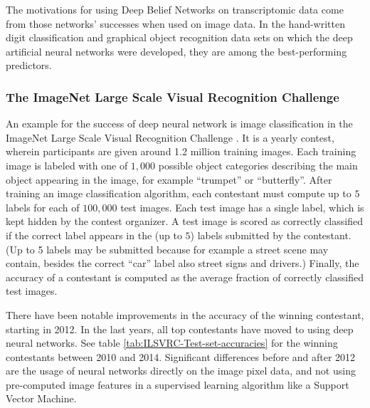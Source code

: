 The motivations for using Deep Belief Networks on transcriptomic data
come from those networks' successes when used on image data. In the
hand-written digit classification and graphical object recognition
data sets on which the deep artificial neural networks were developed,
they are among the best-performing predictors.

\subsubsection{The ImageNet Large Scale Visual Recognition Challenge}

An example for the success of deep neural network is image classification
in the ImageNet Large Scale Visual Recognition Challenge \cite{RussakovskyFeiFei2015}.
It is a yearly contest, wherein participants are given around 1.2
million training images. Each training image is labeled with one of
$1,000$ possible object categories describing the main object appearing
in the image, for example ``trumpet'' or ``butterfly''. After
training an image classification algorithm, each contestant must compute
up to $5$ labels for each of $100,000$ test images. Each test image
has a single label, which is kept hidden by the contest organizer.
A test image is scored as correctly classified if the correct label
appears in the (up to $5$) labels submitted by the contestant. (Up
to 5 labels may be submitted because for example a street scene may
contain, besides the correct ``car'' label also street signs and
drivers.) Finally, the accuracy of a contestant is computed as the
average fraction of correctly classified test images.

There have been notable improvements in the accuracy of the winning
contestant, starting in 2012. In the last years, all top contestants
have moved to using deep neural networks. See table \ref{tab:ILSVRC-Test-set-accuracies}
for the winning contestants between 2010 and 2014. Significant differences
before and after 2012 are the usage of neural networks directly on
the image pixel data, and not using pre-computed image features in
a supervised learning algorithm like a Support Vector Machine.

